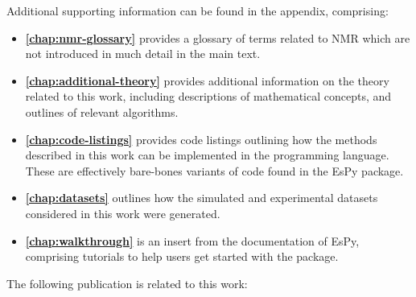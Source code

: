 Additional supporting information can be found in the appendix, comprising:
\begin{itemize}
    \item \textbf{\cref{chap:nmr-glossary}} provides a glossary of terms
        related to \ac{NMR} which are not introduced in much detail in the main
        text.
    \item \textbf{\cref{chap:additional-theory}} provides additional
        information on the theory related to this work, including descriptions
        of mathematical concepts, and outlines of relevant algorithms.
    \item \textbf{\cref{chap:code-listings}} provides code listings outlining
        how the methods described in this work can be implemented in the
        \Python programming language.
        These are effectively bare-bones variants of code found in the
        \ac{EsPy} package.
    \item \textbf{\cref{chap:datasets}} outlines how the simulated and
        experimental datasets considered in this work were generated.
    \item \textbf{\cref{chap:walkthrough}} is an insert from the documentation
        of \ac{EsPy}, comprising tutorials to help users get started with the
        package.
\end{itemize}

The following publication is related to this work:



